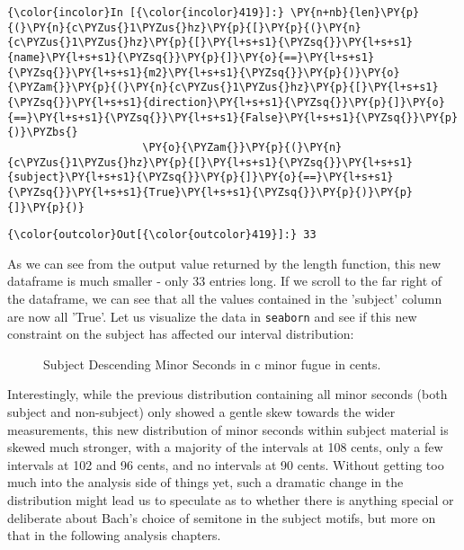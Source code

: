     \begin{Verbatim}[commandchars=\\\{\}]
{\color{incolor}In [{\color{incolor}419}]:} \PY{n+nb}{len}\PY{p}{(}\PY{n}{c\PYZus{}1\PYZus{}hz}\PY{p}{[}\PY{p}{(}\PY{n}{c\PYZus{}1\PYZus{}hz}\PY{p}{[}\PY{l+s+s1}{\PYZsq{}}\PY{l+s+s1}{name}\PY{l+s+s1}{\PYZsq{}}\PY{p}{]}\PY{o}{==}\PY{l+s+s1}{\PYZsq{}}\PY{l+s+s1}{m2}\PY{l+s+s1}{\PYZsq{}}\PY{p}{)}\PY{o}{\PYZam{}}\PY{p}{(}\PY{n}{c\PYZus{}1\PYZus{}hz}\PY{p}{[}\PY{l+s+s1}{\PYZsq{}}\PY{l+s+s1}{direction}\PY{l+s+s1}{\PYZsq{}}\PY{p}{]}\PY{o}{==}\PY{l+s+s1}{\PYZsq{}}\PY{l+s+s1}{False}\PY{l+s+s1}{\PYZsq{}}\PY{p}{)}\PYZbs{}
                     \PY{o}{\PYZam{}}\PY{p}{(}\PY{n}{c\PYZus{}1\PYZus{}hz}\PY{p}{[}\PY{l+s+s1}{\PYZsq{}}\PY{l+s+s1}{subject}\PY{l+s+s1}{\PYZsq{}}\PY{p}{]}\PY{o}{==}\PY{l+s+s1}{\PYZsq{}}\PY{l+s+s1}{True}\PY{l+s+s1}{\PYZsq{}}\PY{p}{)}\PY{p}{]}\PY{p}{)}
\end{Verbatim}
\begin{Verbatim}[commandchars=\\\{\}]
{\color{outcolor}Out[{\color{outcolor}419}]:} 33
\end{Verbatim}
    As we can see from the output value returned by the length function,
this new dataframe is much smaller - only 33 entries long. If we scroll
to the far right of the dataframe, we can see that all the values
contained in the 'subject' column are now all 'True'. Let us visualize
the data in \texttt{seaborn} and see if this new constraint on the
subject has affected our interval distribution:




\begin{figure}[H]
\vspace{1.5em}
    \centering
    \caption{ Subject Descending Minor Seconds in c minor fugue in cents. }
\end{figure}    Interestingly, while the previous distribution containing all minor
seconds (both subject and non-subject) only showed a gentle skew towards
the wider measurements, this new distribution of minor seconds within
subject material is skewed much stronger, with a majority of the
intervals at 108 cents, only a few intervals at 102 and 96 cents, and no
intervals at 90 cents. Without getting too much into the analysis side
of things yet, such a dramatic change in the distribution might lead us
to speculate as to whether there is anything special or deliberate about
Bach's choice of semitone in the subject motifs, but more on that in the
following analysis chapters.

